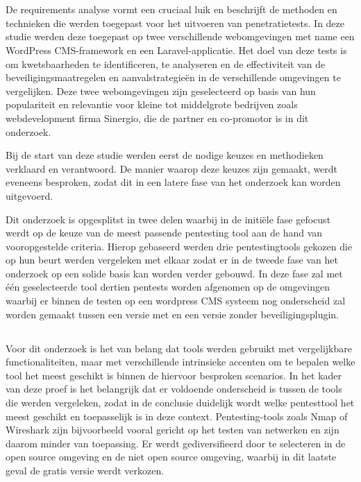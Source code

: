 \section{}
De requirements analyse vormt een cruciaal luik en beschrijft de methoden en technieken die werden toegepast 
voor het uitvoeren van penetratietests. In deze studie werden deze toegepast op twee 
verschillende webomgevingen met name een WordPress CMS-framework en een Laravel-applicatie. Het doel van deze tests is om kwetsbaarheden te identificeren, te 
analyseren en de effectiviteit van de beveiligingsmaatregelen en aanvalstrategieën in de verschillende omgevingen te vergelijken.
Deze twee webomgevingen zijn geselecteerd op basis van hun populariteit en relevantie voor kleine tot middelgrote bedrijven 
zoals webdevelopment firma Sinergio, die de partner en co-promotor is in dit onderzoek.

Bij de start van deze studie werden eerst de nodige keuzes en methodieken verklaard en verantwoord. De manier waarop deze keuzes zijn gemaakt, werdt eveneens 
besproken, zodat dit in een latere fase van het onderzoek kan worden uitgevoerd.

Dit onderzoek is opgesplitst in twee delen waarbij in de initiële fase gefocust werdt op de keuze van de meest passende pentesting tool 
aan de hand van vooropgestelde criteria. Hierop gebaseerd werden drie pentestingtools gekozen die op hun beurt werden vergeleken met elkaar 
zodat er in de tweede fase van het onderzoek op een solide basis kan worden verder gebouwd. In deze fase zal met één geselecteerde 
tool dertien pentests worden afgenomen op de omgevingen waarbij er binnen de testen op een wordpress CMS systeem nog onderscheid zal worden gemaakt 
tussen een versie met en een versie zonder beveiligingsplugin.

\subsection{}
Voor dit onderzoek is het van 
belang dat tools werden gebruikt met vergelijkbare functionaliteiten, maar met verschillende intrinsieke accenten om te bepalen welke 
tool het meest geschikt is binnen de hiervoor besproken scenarios. In het kader van deze proef is het belangrijk dat er voldoende onderscheid is tussen de tools 
die werden vergeleken, zodat in de conclusie duidelijk wordt welke pentesttool het meest geschikt en toepasselijk is in deze context. 
Pentesting-tools zoals Nmap of Wireshark zijn bijvoorbeeld vooral gericht op het testen van netwerken en  zijn daarom minder van toepassing. Er werdt
gediversifieerd door te selecteren in de open source omgeving en de niet open source omgeving, waarbij in dit laatste geval de gratis versie werdt 
verkozen. 

